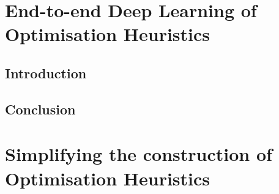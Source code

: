 \ifstapled
\chapter{End-to-end Deep Learning of Optimisation Heuristics}
\section{Introduction}
\lipsum[1-2]

\section{Conclusion}
\lipsum[1-2]
\else
\chapter{Simplifying the construction of Optimisation Heuristics}
\label{chap:deeptune}




% 

\fi
